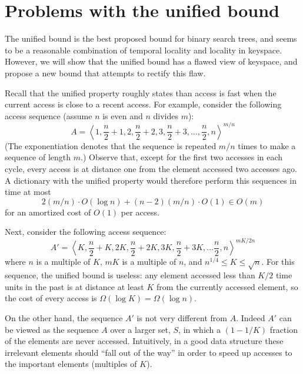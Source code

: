 \documentclass{llncs}
\newcommand{\BigOh}[1]{O\!\left(#1\right)}
\newcommand{\BigOmega}[1]{\Omega\!\left(#1\right)}
\begin{document}
\section{Problems with the unified bound}

The unified bound is the best proposed bound for binary search trees, and seems to be a reasonable combination of temporal locality and locality in keyspace. However, we will show that the unified bound has a flawed view of keyspace, and propose a new bound that attempts to rectify this flaw.

Recall that the unified property roughly states than access is fast when the current access is close to a recent access. For example, consider the following access sequence (assume $n$ is even and $n$ divides $m$): \begin{equation}
	A = \left\langle 1, \frac{n}{2}+1, 2, \frac{n}{2}+2, 3, \frac{n}{2}+3, \ldots, \frac{n}{2}, n \right\rangle^{m/n} \label{eq:bear}
\end{equation}
(The exponentiation denotes that the sequence is repeated $m/n$ times
to make a sequence of length $m$.)
Observe that, except for the first two accesses in each cycle, every access is at distance one from the element accessed two accesses ago.  A dictionary with the unified
property would therefore perform this sequences in time at most
\[
   2(m/n)\cdot \BigOh{\log n} + (n-2)(m/n)\cdot \BigOh{1} \in \BigOh{m}
\]
for an amortized cost of $\BigOh{1}$ per access.  

Next, consider the following access sequence:
\begin{equation}
	A' = \left\langle K, \frac{n}{2}+K, 2K, \frac{n}{2}+2K, 3K, \frac{n}{2}+3K, \ldots \frac{n}{2},n\right\rangle^{mK/2n}
\end{equation}
where $n$ is a multiple of $K$, $mK$ is a multiple of $n$, and $n^{1/4}\le K\le\sqrt{n}$. For this sequence, the unified bound is useless: any element accessed less than $K/2$ time units in the past is at distance at least $K$ from the currently accessed element, so the cost of every access is $\BigOmega{\log K} = \BigOmega{\log n}$.

On the other hand, the sequence $A'$ is not very different from $A$.  Indeed $A'$ can be viewed as the sequence $A$ over a larger set, $S$, in which a $(1-1/K)$ fraction of the elements are never accessed.  Intuitively, in a good data structure these irrelevant elements should ``fall out of the way'' in order to speed up accesses to the important elements (multiples of $K$).
\end{document}
